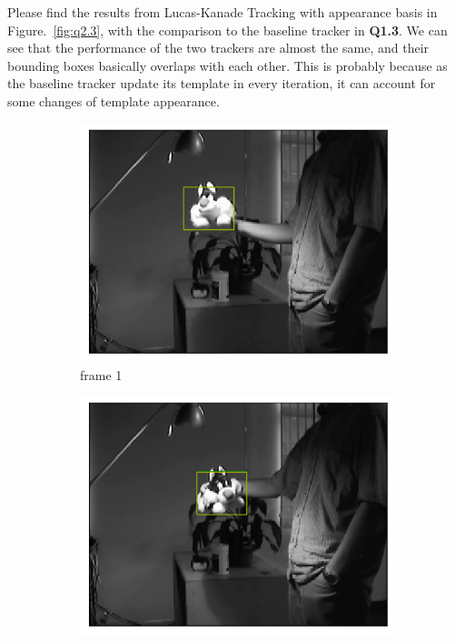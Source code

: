 \documentclass[11pt]{article}
\begin{document}
Please find the results from Lucas-Kanade Tracking with appearance basis in Figure.~\ref{fig:q2.3}, with the comparison to the baseline tracker in \textbf{Q1.3}. We can see that the performance of the two trackers are almost the same, and their bounding boxes basically overlaps with each other. This is probably because as the baseline tracker update its template in every iteration, it can account for some changes of template appearance.

\begin{figure}[h!]
    \begin{subfigure}{.195\textwidth}
      \centering
      \includegraphics[width=.95\linewidth]{../results/sylvseqrects_0.png}
      \caption{frame 1}
    \end{subfigure}
    \begin{subfigure}{.195\textwidth}
      \centering
      \includegraphics[width=.95\linewidth]{../results/sylvseqrects_199.png}

\end{subfigure}
\end{figure}
\end{document}
